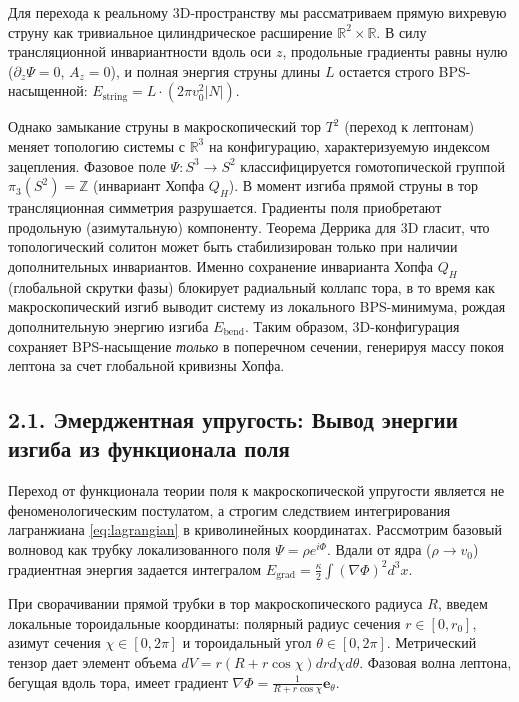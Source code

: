 \documentclass[12pt,a4paper]{article}
\begin{document}
Для перехода к реальному 3D-пространству мы рассматриваем прямую вихревую струну как тривиальное цилиндрическое расширение $\mathbb{R}^2 \times \mathbb{R}$. В силу трансляционной инвариантности вдоль оси $z$, продольные градиенты равны нулю ($\partial_z \Psi = 0$, $A_z = 0$), и полная энергия струны длины $L$ остается строго BPS-насыщенной: $E_{\text{string}} = L \cdot (2\pi v_0^2 |N|)$. 

Однако замыкание струны в макроскопический тор $T^2$ (переход к лептонам) меняет топологию системы с $\mathbb{R}^3$ на конфигурацию, характеризуемую индексом зацепления. Фазовое поле $\Psi: S^3 \to S^2$ классифицируется гомотопической группой $\pi_3(S^2) = \mathbb{Z}$ (инвариант Хопфа $Q_H$).
В момент изгиба прямой струны в тор трансляционная симметрия разрушается. Градиенты поля приобретают продольную (азимутальную) компоненту. Теорема Деррика для 3D гласит, что топологический солитон может быть стабилизирован только при наличии дополнительных инвариантов. Именно сохранение инварианта Хопфа $Q_H$ (глобальной скрутки фазы) блокирует радиальный коллапс тора, в то время как макроскопический изгиб выводит систему из локального BPS-минимума, рождая дополнительную энергию изгиба $E_{\text{bend}}$. Таким образом, 3D-конфигурация сохраняет BPS-насыщение \textit{только} в поперечном сечении, генерируя массу покоя лептона за счет глобальной кривизны Хопфа.

\subsection{2.1. Эмерджентная упругость: Вывод энергии изгиба из функционала поля}
Переход от функционала теории поля к макроскопической упругости является не феноменологическим постулатом, а строгим следствием интегрирования лагранжиана \eqref{eq:lagrangian} в криволинейных координатах.
Рассмотрим базовый волновод как трубку локализованного поля $\Psi = \rho e^{i\Phi}$. Вдали от ядра ($\rho \to v_0$) градиентная энергия задается интегралом $E_{\text{grad}} = \frac{\kappa}{2} \int (\nabla \Phi)^2 d^3x$.

При сворачивании прямой трубки в тор макроскопического радиуса $R$, введем локальные тороидальные координаты: полярный радиус сечения $r \in [0, r_0]$, азимут сечения $\chi \in [0, 2\pi]$ и тороидальный угол $\theta \in [0, 2\pi]$. Метрический тензор дает элемент объема $dV = r(R + r\cos\chi) dr d\chi d\theta$.
Фазовая волна лептона, бегущая вдоль тора, имеет градиент $\nabla \Phi = \frac{1}{R + r\cos\chi} \mathbf{e}_\theta$.
\end{document}
